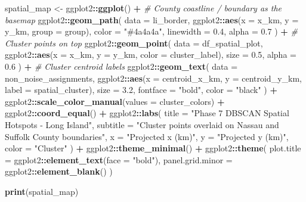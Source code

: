 \documentclass[
]{article}
\newenvironment{Shaded}{\begin{snugshade}}{\end{snugshade}}
\newcommand{\AttributeTok}[1]{\textcolor[rgb]{0.13,0.29,0.53}{#1}}
\newcommand{\CommentTok}[1]{\textcolor[rgb]{0.56,0.35,0.01}{\textit{#1}}}
\newcommand{\FloatTok}[1]{\textcolor[rgb]{0.00,0.00,0.81}{#1}}
\newcommand{\FunctionTok}[1]{\textcolor[rgb]{0.13,0.29,0.53}{\textbf{#1}}}
\newcommand{\NormalTok}[1]{#1}
\newcommand{\OtherTok}[1]{\textcolor[rgb]{0.56,0.35,0.01}{#1}}
\newcommand{\SpecialCharTok}[1]{\textcolor[rgb]{0.81,0.36,0.00}{\textbf{#1}}}
\newcommand{\StringTok}[1]{\textcolor[rgb]{0.31,0.60,0.02}{#1}}
\begin{document}
\begin{Shaded}
\begin{Highlighting}[]
\NormalTok{spatial\_map }\OtherTok{\textless{}{-}}\NormalTok{ ggplot2}\SpecialCharTok{::}\FunctionTok{ggplot}\NormalTok{() }\SpecialCharTok{+}
  \CommentTok{\# County coastline / boundary as the basemap}
\NormalTok{  ggplot2}\SpecialCharTok{::}\FunctionTok{geom\_path}\NormalTok{(}
    \AttributeTok{data =}\NormalTok{ li\_border,}
\NormalTok{    ggplot2}\SpecialCharTok{::}\FunctionTok{aes}\NormalTok{(}\AttributeTok{x =}\NormalTok{ x\_km, }\AttributeTok{y =}\NormalTok{ y\_km, }\AttributeTok{group =}\NormalTok{ group),}
    \AttributeTok{color =} \StringTok{"\#4a4a4a"}\NormalTok{,}
    \AttributeTok{linewidth =} \FloatTok{0.4}\NormalTok{,}
    \AttributeTok{alpha =} \FloatTok{0.7}
\NormalTok{  ) }\SpecialCharTok{+}
  \CommentTok{\# Cluster points on top}
\NormalTok{  ggplot2}\SpecialCharTok{::}\FunctionTok{geom\_point}\NormalTok{(}
    \AttributeTok{data =}\NormalTok{ df\_spatial\_plot,}
\NormalTok{    ggplot2}\SpecialCharTok{::}\FunctionTok{aes}\NormalTok{(}\AttributeTok{x =}\NormalTok{ x\_km, }\AttributeTok{y =}\NormalTok{ y\_km, }\AttributeTok{color =}\NormalTok{ cluster\_label),}
    \AttributeTok{size =} \FloatTok{0.5}\NormalTok{,}
    \AttributeTok{alpha =} \FloatTok{0.6}
\NormalTok{  ) }\SpecialCharTok{+}
  \CommentTok{\# Cluster centroid labels}
\NormalTok{  ggplot2}\SpecialCharTok{::}\FunctionTok{geom\_text}\NormalTok{(}
    \AttributeTok{data =}\NormalTok{ non\_noise\_assignments,}
\NormalTok{    ggplot2}\SpecialCharTok{::}\FunctionTok{aes}\NormalTok{(}\AttributeTok{x =}\NormalTok{ centroid\_x\_km, }\AttributeTok{y =}\NormalTok{ centroid\_y\_km, }\AttributeTok{label =}\NormalTok{ spatial\_cluster),}
    \AttributeTok{size =} \FloatTok{3.2}\NormalTok{,}
    \AttributeTok{fontface =} \StringTok{"bold"}\NormalTok{,}
    \AttributeTok{color =} \StringTok{"black"}
\NormalTok{  ) }\SpecialCharTok{+}
\NormalTok{  ggplot2}\SpecialCharTok{::}\FunctionTok{scale\_color\_manual}\NormalTok{(}\AttributeTok{values =}\NormalTok{ cluster\_colors) }\SpecialCharTok{+}
\NormalTok{  ggplot2}\SpecialCharTok{::}\FunctionTok{coord\_equal}\NormalTok{() }\SpecialCharTok{+}
\NormalTok{  ggplot2}\SpecialCharTok{::}\FunctionTok{labs}\NormalTok{(}
    \AttributeTok{title =} \StringTok{"Phase 7 DBSCAN Spatial Hotspots {-} Long Island"}\NormalTok{,}
    \AttributeTok{subtitle =} \StringTok{"Cluster points overlaid on Nassau and Suffolk County boundaries"}\NormalTok{,}
    \AttributeTok{x =} \StringTok{"Projected x (km)"}\NormalTok{,}
    \AttributeTok{y =} \StringTok{"Projected y (km)"}\NormalTok{,}
    \AttributeTok{color =} \StringTok{"Cluster"}
\NormalTok{  ) }\SpecialCharTok{+}
\NormalTok{  ggplot2}\SpecialCharTok{::}\FunctionTok{theme\_minimal}\NormalTok{() }\SpecialCharTok{+}
\NormalTok{  ggplot2}\SpecialCharTok{::}\FunctionTok{theme}\NormalTok{(}
    \AttributeTok{plot.title =}\NormalTok{ ggplot2}\SpecialCharTok{::}\FunctionTok{element\_text}\NormalTok{(}\AttributeTok{face =} \StringTok{"bold"}\NormalTok{),}
    \AttributeTok{panel.grid.minor =}\NormalTok{ ggplot2}\SpecialCharTok{::}\FunctionTok{element\_blank}\NormalTok{()}
\NormalTok{  )}

\FunctionTok{print}\NormalTok{(spatial\_map)}
\end{Highlighting}
\end{Shaded}
\end{document}
